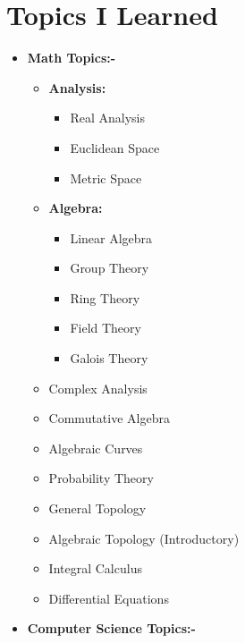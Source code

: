 \documentclass[10pt,a4paper,sans,colorlinks]{moderncv}        %
\begin{document}
\section{Topics I Learned}



\begin{itemize}
	\item 	\textbf{Math Topics:-}
	      \begin{itemize}
\item \textbf{Analysis:}
		      \begin{multicols}{3}
			       \begin{itemize}
				      \item Real Analysis
				      \item Euclidean Space
				      \item Metric Space
			      \end{itemize}
		      \end{multicols}
			      \item \textbf{Algebra:}\begin{multicols}{3}
			     	 \begin{itemize}
			     		\item Linear Algebra
			     		\item Group Theory
			     		\item Ring Theory
			     		\item Field Theory
			     		\item Galois Theory
			     		
			     	\end{itemize}
			     \end{multicols}
			      \end{itemize}
			      
			      \begin{multicols}{2}
			      	\begin{itemize}
			      \item Complex Analysis
			     \item Commutative Algebra
			     \item Algebraic Curves
			      \item Probability Theory
			     
			      \item General Topology
			      \item Algebraic Topology (Introductory)
			      \item Integral Calculus
			      \item Differential Equations
	      \end{itemize}
			      \end{multicols}
      \pagebreak
	\item \textbf{Computer Science Topics:-}
	      \begin{itemize}


\end{itemize}
\end{itemize}
\end{document}
